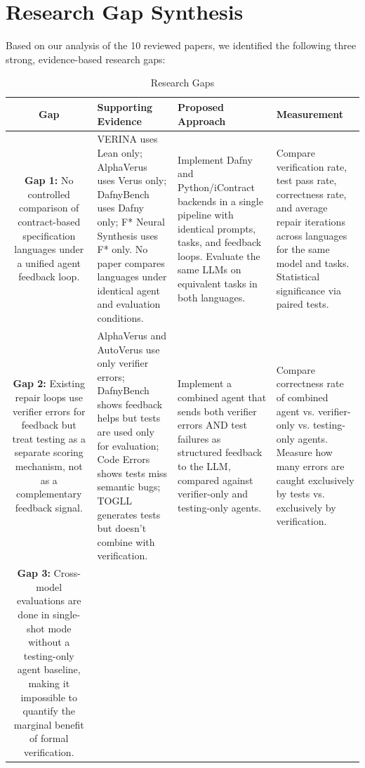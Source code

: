 \documentclass[11pt,a4paper]{article}
\begin{document}
\section{Research Gap Synthesis}

Based on our analysis of the 10 reviewed papers, we identified the following three strong, evidence-based research gaps:

\begin{table}[H]
\centering
\caption{Research Gaps}
\label{tab:gaps}
\small
\begin{tabularx}{\textwidth}{|c|X|X|X|}
\hline
\textbf{Gap} & \textbf{Supporting Evidence} & \textbf{Proposed Approach} & \textbf{Measurement} \\
\hline
\textbf{Gap 1:} No controlled comparison of contract-based specification languages under a unified agent feedback loop. & 
VERINA \cite{verina2026} uses Lean only; AlphaVerus \cite{alphaVerus2025} uses Verus only; DafnyBench \cite{dafnybench2025} uses Dafny only; F* Neural Synthesis \cite{fstar2025} uses F* only. No paper compares languages under identical agent and evaluation conditions. &
Implement Dafny and Python/iContract backends in a single pipeline with identical prompts, tasks, and feedback loops. Evaluate the same LLMs on equivalent tasks in both languages. &
Compare verification rate, test pass rate, correctness rate, and average repair iterations across languages for the same model and tasks. Statistical significance via paired tests. \\
\hline
\textbf{Gap 2:} Existing repair loops use verifier errors for feedback but treat testing as a separate scoring mechanism, not as a complementary feedback signal. & 
AlphaVerus \cite{alphaVerus2025} and AutoVerus \cite{autoverus2025} use only verifier errors; DafnyBench \cite{dafnybench2025} shows feedback helps but tests are used only for evaluation; Code Errors \cite{codeerrors2025} shows tests miss semantic bugs; TOGLL \cite{togll2025} generates tests but doesn't combine with verification. &
Implement a combined agent that sends both verifier errors AND test failures as structured feedback to the LLM, compared against verifier-only and testing-only agents. &
Compare correctness rate of combined agent vs. verifier-only vs. testing-only agents. Measure how many errors are caught exclusively by tests vs. exclusively by verification. \\
\hline
\textbf{Gap 3:} Cross-model evaluations are done in single-shot mode without a testing-only agent baseline, making it impossible to quantify the marginal benefit of formal verification. &

\end{tabularx}
\end{table}
\end{document}
